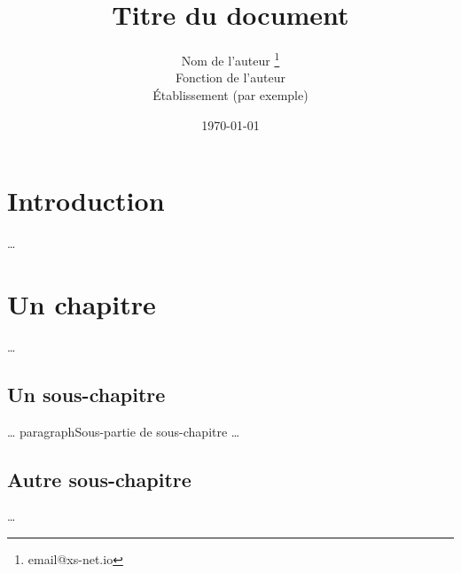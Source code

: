 \documentclass[french, 12pt, twoside, a4paper]{article}
\title{Titre du document}
\author{Nom de l'auteur \thanks{email@xs-net.io} \\
Fonction de l'auteur \\
Établissement (par exemple)}
\date{\today}
\begin{document}
\maketitle     %


\section*{Introduction}

…

\section{Un chapitre}
…

\subsection{Un sous-chapitre}
…
paragraph{Sous-partie de sous-chapitre}
…

\subsection{Autre sous-chapitre}
…

%
\end{document}
